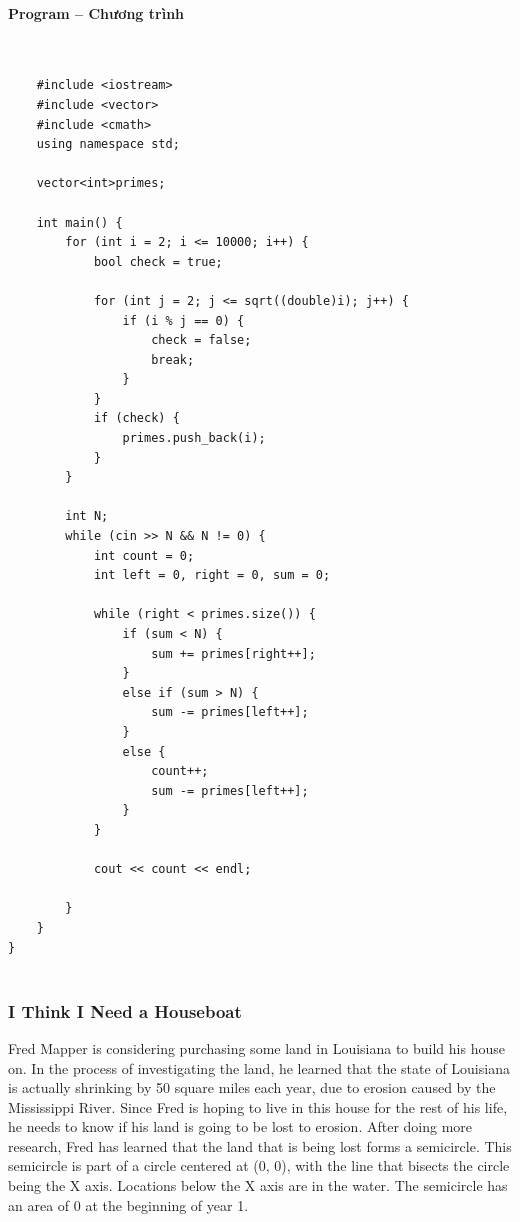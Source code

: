 \documentclass{article}
\begin{document}
\paragraph{Program -- Chương trình} \mbox{} \\


\begin{lstlisting}
	#include <iostream>
	#include <vector>
	#include <cmath>
	using namespace std;
	
	vector<int>primes;
	
	int main() {
		for (int i = 2; i <= 10000; i++) {
			bool check = true;
	
			for (int j = 2; j <= sqrt((double)i); j++) {
				if (i % j == 0) {
					check = false;
					break;
				}
			}
			if (check) {
				primes.push_back(i);
			}
		}
	
		int N;
		while (cin >> N && N != 0) {
			int count = 0;
			int left = 0, right = 0, sum = 0;
	
			while (right < primes.size()) {
				if (sum < N) {
					sum += primes[right++];
				}
				else if (sum > N) {
					sum -= primes[left++];
				}
				else {
					count++;
					sum -= primes[left++];
				}
			}
	
			cout << count << endl;
	
		}
	}
}
	
\end{lstlisting}


\subsubsection{I Think I Need a Houseboat}

Fred Mapper is considering purchasing some land in Louisiana to build his house on. In the
process of investigating the land, he learned that the state of Louisiana is actually shrinking by
50 square miles each year, due to erosion caused by the Mississippi River. Since Fred is hoping to
live in this house for the rest of his life, he needs to know if his land is going to be lost to erosion.
After doing more research, Fred has learned that the land that is being lost forms a semicircle.
This semicircle is part of a circle centered at (0, 0), with the line that bisects the circle being the X axis. Locations below the X axis are in the water. The semicircle has an area of 0 at the beginning
of year 1. \\
\end{document}
